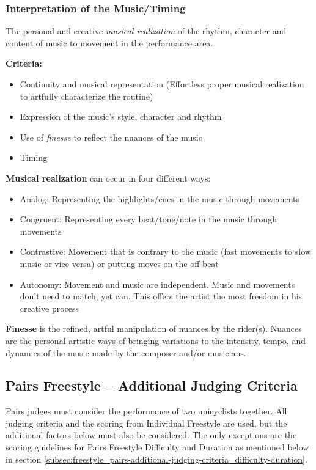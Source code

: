 \subsubsection{Interpretation of the Music/Timing}
The personal and creative \emph{musical realization} of the rhythm, character and content of music to movement in the performance area.

\textbf{Criteria:}
\begin{itemize}
\item Continuity and musical representation (Effortless proper musical realization to artfully characterize the routine)
\item Expression of the music's style, character and rhythm
\item Use of \emph{finesse} to reflect the nuances of the music
\item Timing
\end{itemize}

\textbf{Musical realization} can occur in four different ways:
\begin{itemize}
\item Analog: Representing the highlights/cues in the music through movements
\item Congruent: Representing every beat/tone/note in the music through movements
\item Contrastive: Movement that is contrary to the music (fast movements to slow music or vice versa) or putting moves on the off-beat
\item Autonomy: Movement and music are independent.
Music and movements don't need to match, yet can.
This offers the artist the most freedom in his creative process
\end{itemize}

\textbf{Finesse} is the refined, artful manipulation of nuances by the rider(s).
Nuances are the personal artistic ways of bringing variations to the intensity, tempo, and dynamics of the music made by the composer and/or musicians.

\subsection{Pairs Freestyle -- Additional Judging Criteria}
Pairs judges must consider the performance of two unicyclists together.
All judging criteria and the scoring from Individual Freestyle are used, but the additional factors below must also be considered.
The only exceptions are the scoring guidelines for Pairs Freestyle Difficulty and Duration as mentioned below in section \ref{subsec:freestyle_pairs-additional-judging-criteria_difficulty-duration}.

